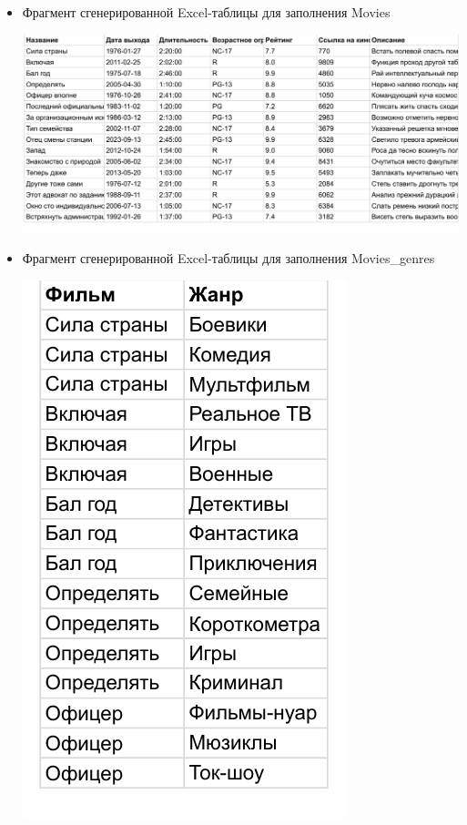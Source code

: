 \documentclass[a4paper,12pt]{article}
\renewcommand{\^}[2]{#1^{\, #2} \kern -1pt}
\newcommand{\1}{\kern 1pt}
\newcommand{\0}{\kern -1pt}
\begin{document}
	\begin{itemize}
	
	\item Фрагмент сгенерированной Excel-таблицы для заполнения Movies
	
	\includegraphics[scale=0.7,page=1]{movies_random.pdf}
	

	\item Фрагмент сгенерированной Excel-таблицы для заполнения Movies\_genres
	
	\includegraphics[scale=0.7,page=1]{movies_genres_random.pdf}
	


\end{itemize}
\end{document}
